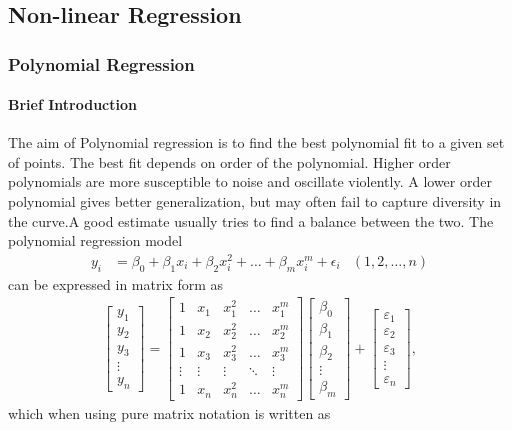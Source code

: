 \documentclass[20pt, a4paper]{report}
\begin{document}
	\chapter{}
	\section{Non-linear Regression}
		\subsection{Polynomial Regression}
			\subsubsection{Brief Introduction}
			The aim of Polynomial regression is to find the best polynomial fit to a given set of points. The best fit depends on order of the polynomial. Higher order polynomials are more susceptible to noise and oscillate violently. A lower order polynomial gives better generalization, but may often fail to capture diversity in the curve.A good estimate usually tries to find a balance between the two.
			\linebreak \linebreak The polynomial regression model 
			\begin{align*}
			y_{i} &= \beta_{0}+\beta_{1}x_{i}+\beta_{2}x_{i}^{2}+\ldots+\beta_{m}x_{i}^{m}+\epsilon_{i} &(1,2,\ldots,n)
			\end{align*}
			can be expressed in matrix form as \begin{align*}
			{\displaystyle {\begin{bmatrix}y_{1}\\y_{2}\\y_{3}\\\vdots \\y_{n}\end{bmatrix}}={\begin{bmatrix}1&x_{1}&x_{1}^{2}&\dots &x_{1}^{m}\\1&x_{2}&x_{2}^{2}&\dots &x_{2}^{m}\\1&x_{3}&x_{3}^{2}&\dots &x_{3}^{m}\\\vdots &\vdots &\vdots &\ddots &\vdots \\1&x_{n}&x_{n}^{2}&\dots &x_{n}^{m}\end{bmatrix}}{\begin{bmatrix}\beta _{0}\\\beta _{1}\\\beta _{2}\\\vdots \\\beta _{m}\end{bmatrix}}+{\begin{bmatrix}\varepsilon _{1}\\\varepsilon _{2}\\\varepsilon _{3}\\\vdots \\\varepsilon _{n}\end{bmatrix}},}
			\end{align*}
			which when using pure matrix notation is written as
\end{document}
